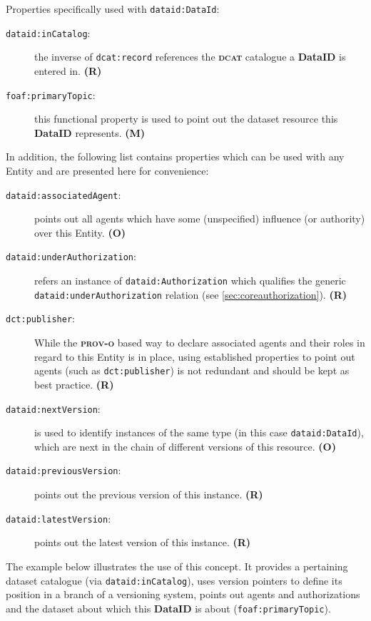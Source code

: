 \documentclass[a4paper,english,twoside,BCOR1.5cm,headsepline,DIV12,appendixprefix,final,12pt]{scrbook}
\newcommand{\dataid}{{\ttfamily\bfseries DataID}\xspace}
\newcommand{\prov}{{\scshape\bfseries prov-o}\xspace}
\newcommand{\dcat}{{\scshape\bfseries dcat}\xspace}
\newcommand{\prop}[1]{{{\texttt{#1}}}}
\begin{document}
Properties specifically used with \prop{dataid:DataId}:
\begin{description}
\item[\prop{dataid:inCatalog}:] the inverse of \prop{dcat:record} references the \dcat catalogue a \dataid is entered in. \textbf{(R)}
\item[\prop{foaf:primaryTopic}:] this functional property is used to point out the dataset resource this \dataid represents. \textbf{(M)}
\end{description}

In addition, the following list contains properties which can be used with any Entity and are presented here for convenience:
\begin{description}
\item[\prop{dataid:associatedAgent}:] points out all agents which have some (unspecified) influence (or authority) over this Entity. \textbf{(O)}
\item[\prop{dataid:underAuthorization}:] refers an instance of \prop{dataid:Authorization} which qualifies the generic \prop{dataid:underAuthorization} relation (see \cref{sec:coreauthorization}). \textbf{(R)}
\item[\prop{dct:publisher}:] While the \prov based way to declare associated agents and their roles in regard to this Entity is in place, using established properties to point out agents (such as \prop{dct:publisher}) is not redundant and should be kept as best practice. \textbf{(R)}
\item[\prop{dataid:nextVersion}:] is used to identify instances of the same type (in this case \prop{dataid:DataId}), which are next in the chain of different versions of this resource. \textbf{(O)}
\item[\prop{dataid:previousVersion}:] points out the previous version of this instance. \textbf{(R)}
\item[\prop{dataid:latestVersion}:] points out the latest version of this instance. \textbf{(R)}
\end{description}

The example below illustrates the use of this concept. It provides a pertaining dataset catalogue (via \prop{dataid:inCatalog}), uses version pointers to define its position in a branch of a versioning system, points out agents and authorizations and the dataset about which this \dataid is about (\prop{foaf:primaryTopic}).
\end{document}
